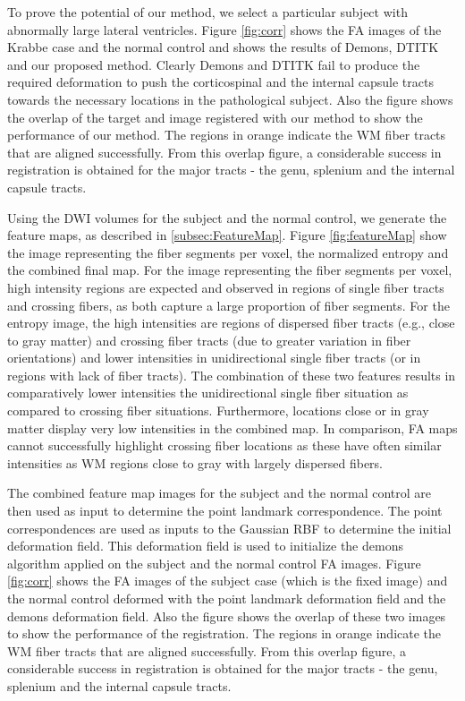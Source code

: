 \documentclass{llncs}
\begin{document}
To prove the potential of our method, we select a particular subject with abnormally large lateral ventricles. Figure \ref{fig:corr} shows the FA images of the Krabbe case and the normal control and shows the results of Demons, DTITK and our proposed method. Clearly Demons and DTITK fail to produce the required deformation to push the corticospinal and the internal capsule tracts towards the necessary locations in the pathological subject. Also the figure shows the overlap of the target and image registered with our method to show the performance of our method. The regions in orange indicate the WM fiber tracts that are aligned successfully. From this overlap figure, a considerable success in registration is obtained for the major tracts - the genu, splenium and the internal capsule tracts.

Using the DWI volumes for the subject and the normal control, we generate the feature maps, as described in \ref{subsec:FeatureMap}. Figure \ref{fig:featureMap} show the image representing the fiber segments per voxel, the normalized entropy and the combined final map. For the image representing the fiber segments per voxel,  high intensity regions are expected and observed in regions of single fiber tracts and crossing fibers, as both capture a large proportion of fiber segments. For the entropy image, the high intensities are regions of dispersed fiber tracts (e.g., close to gray matter) and crossing fiber tracts (due to greater variation in fiber orientations) and lower intensities in unidirectional single fiber tracts (or in regions with lack of fiber tracts). The combination of  these two features results in comparatively lower intensities the unidirectional single fiber situation as compared to crossing fiber situations. Furthermore, locations close or in gray matter display very low intensities in the combined map.  In comparison, FA maps cannot successfully highlight crossing fiber locations as these have often similar intensities as WM regions close to gray with largely dispersed fibers.

The combined feature map images for the subject and the normal control are then used as input to determine the point landmark correspondence. The point correspondences are used as inputs to the Gaussian RBF to determine the initial deformation field. This deformation field is used to initialize the demons algorithm applied on the subject and the normal control FA images. Figure \ref{fig:corr} shows the FA images of the subject case (which is the fixed image) and the normal control deformed with the point landmark deformation field and the demons deformation field. Also the figure shows the overlap of these two images to show the performance of the registration. The regions in orange indicate the WM fiber tracts that are aligned successfully. From this overlap figure, a considerable success in registration is obtained for the major tracts - the genu, splenium and the internal capsule tracts.
\end{document}
